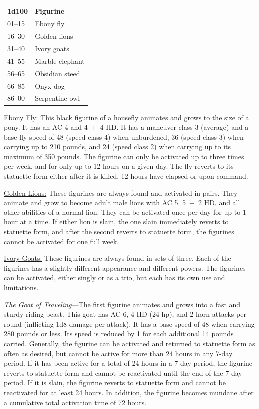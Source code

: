\begin{multicols}{2}
\noindent \begin{tabular}{|p{}|p{}|}
\hline
1d100	& Figurine \\
\hline\hline
\rowcolor[gray]{.9}01--15	& Ebony fly \\
16--30	& Golden lions \\
\rowcolor[gray]{.9}31--40	& Ivory goats \\
41--55	& Marble elephant \\
\rowcolor[gray]{.9}56--65	& Obsidian steed \\
66--85	& Onyx dog \\
\rowcolor[gray]{.9}86--00	& Serpentine owl \\
\hline
\end{tabular}


\underline{Ebony Fly:} This black figurine of a housefly animates and grows to the size of a pony.  It has an AC 4 and 4~+~4 HD.  It has a maneuver class 3 (average) and a base fly speed of 48 (speed class 4) when unburdened, 36 (speed class 3) when carrying up to 210 pounds, and 24 (speed class 2) when carrying up to its maximum of 350 pounds.  The figurine can only be activated up to three times per week, and for only up to 12 hours on a given day.  The fly reverts to its statuette form either after it is killed, 12 hours have elapsed or upon command.

\underline{Golden Lions:} These figurines are always found and activated in pairs.  They animate and grow to become adult male lions with AC 5, 5~+~2 HD, and all other abilities of a normal lion.  They can be activated once per day for up to 1 hour at a time.  If either lion is slain, the one slain immediately reverts to statuette form, and after the second reverts to statuette form, the figurines cannot be activated for one full week.  

\underline{Ivory Goats:} These figurines are always found in sets of three.  Each of the figurines has a slightly different appearance and different powers.  The figurines can be activated, either singly or as a trio, but each has its own use and limitations.

\textit{The Goat of Traveling}---The first figurine animates and grows into a fast and sturdy riding beast.  This goat has AC 6, 4 HD (24 hp), and 2 horn attacks per round (inflicting 1d8 damage per attack).  It has a base speed of 48 when carrying 280 pounds or less.  Its speed is reduced by 1 for each additional 14 pounds carried.  Generally, the figurine can be activated and returned to statuette form as often as desired, but cannot be active for more than 24 hours in any 7-day period.  If it has been active for a total of 24 hours in a 7-day period, the figurine reverts to statuette form and cannot be reactivated until the end of the 7-day period.  If it is slain, the figurine reverts to statuette form and cannot be reactivated for at least 24 hours.  In addition, the figurine becomes mundane after a cumulative total activation time of 72 hours.


\end{multicols}

